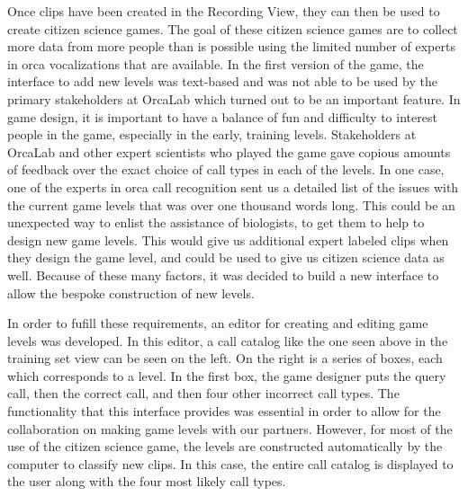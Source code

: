 \documentclass[12pt,oneside]{book}
\begin{document}
Once clips have been created in the Recording View, they can then be
used to create citizen science games.  The goal of these citizen
science games are to collect more data from more people than is
possible using the limited number of experts in orca vocalizations
that are available.  In the first version of the game, the interface
to add new levels was text-based and was not able to be used by the
primary stakeholders at OrcaLab which turned out to be an important
feature.  In game design, it is important to have a balance of fun and
difficulty to interest people in the game, especially in the early,
training levels.  Stakeholders at OrcaLab and other expert scientists
who played the game gave copious amounts of feedback over the exact
choice of call types in each of the levels.  In one case, one of the
experts in orca call recognition sent us a detailed list of the issues
with the current game levels that was over one thousand words long.
This could be an unexpected way to enlist the assistance of
biologists, to get them to help to design new game levels.  This would
give us additional expert labeled clips when they design the game
level, and could be used to give us citizen science data as well.
Because of these many factors, it was decided to build a new interface
to allow the bespoke construction of new levels.

In order to fufill these requirements, an editor for creating and
editing game levels was developed.  In this editor, a call catalog
like the one seen above in the training set view can be seen on the
left.  On the right is a series of boxes, each which corresponds to a
level.  In the first box, the game designer puts the query call, then
the correct call, and then four other incorrect call types.  The
functionality that this interface provides was essential in order to
allow for the collaboration on making game levels with our partners.
However, for most of the use of the citizen science game, the levels
are constructed automatically by the computer to classify new clips.
In this case, the entire call catalog is displayed to the user along
with the four most likely call types.
\end{document}
